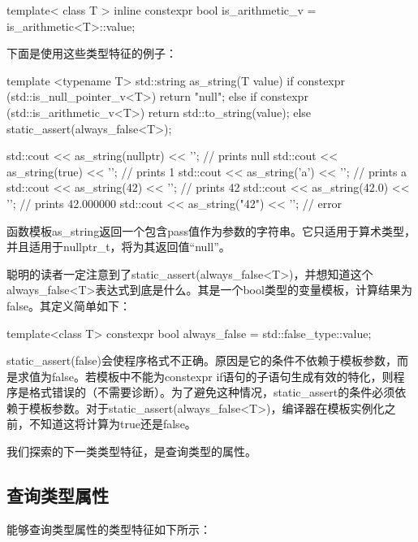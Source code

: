 \begin{cpp}
template< class T >
inline constexpr bool is_arithmetic_v =
	is_arithmetic<T>::value;
\end{cpp}

下面是使用这些类型特征的例子：

\begin{cpp}
template <typename T>
std::string as_string(T value)
{
	if constexpr (std::is_null_pointer_v<T>)
		return "null";
	else if constexpr (std::is_arithmetic_v<T>)
		return std::to_string(value);
	else
		static_assert(always_false<T>);
}

std::cout << as_string(nullptr) << '\n'; // prints null
std::cout << as_string(true) << '\n'; // prints 1
std::cout << as_string('a') << '\n'; // prints a
std::cout << as_string(42) << '\n'; // prints 42
std::cout << as_string(42.0) << '\n'; // prints 42.000000
std::cout << as_string("42") << '\n'; // error
\end{cpp}

函数模板as\_string返回一个包含pass值作为参数的字符串。它只适用于算术类型，并且适用于nullptr\_t，将为其返回值“null”。

聪明的读者一定注意到了static\_assert(always\_false<T>)，并想知道这个always\_false<T>表达式到底是什么。其是一个bool类型的变量模板，计算结果为false。其定义简单如下：

\begin{cpp}
template<class T>
constexpr bool always_false = std::false_type::value;
\end{cpp}

static\_assert(false)会使程序格式不正确。原因是它的条件不依赖于模板参数，而是求值为false。若模板中不能为constexpr if语句的子语句生成有效的特化，则程序是格式错误的（不需要诊断）。为了避免这种情况，static\_assert的条件必须依赖于模板参数。对于static\_assert(always\_false<T>)，编译器在模板实例化之前，不知道这将计算为true还是false。

我们探索的下一类类型特征，是查询类型的属性。

\subsection{查询类型属性}

能够查询类型属性的类型特征如下所示：

